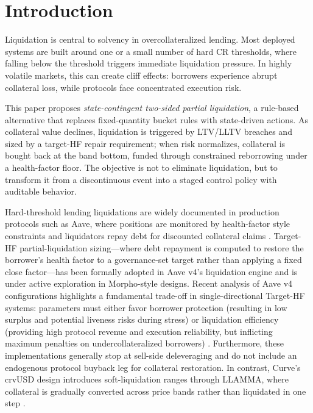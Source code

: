 \documentclass[12pt]{article}
\begin{document}
\begin{abstract}
deep-crash paths, the guarded leg never induces extra liquidation and incurs zero bad debt; its USD benefit is small and dormant on calm windows (it acts only over a full drawdown--rebound cycle) and large in crashes, tracing a restoration-vs-re-leverage trade-off set explicitly by the floor. We report effect sizes with attention to window dependence---the rolling windows overlap, so their paired $p$-values are descriptive rather than independent evidence---and provide a fully reproducible protocol that regenerates every result.
\end{abstract}

\section{Introduction}
Liquidation is central to solvency in overcollateralized lending. Most deployed systems are built around one or a small number of hard CR thresholds, where falling below the threshold triggers immediate liquidation pressure. In highly volatile markets, this can create cliff effects: borrowers experience abrupt collateral loss, while protocols face concentrated execution risk.

This paper proposes \emph{state-contingent two-sided partial liquidation}, a rule-based alternative that replaces fixed-quantity bucket rules with state-driven actions. As collateral value declines, liquidation is triggered by LTV/LLTV breaches and sized by a target-HF repair requirement; when risk normalizes, collateral is bought back at the band bottom, funded through constrained reborrowing under a health-factor floor. The objective is not to eliminate liquidation, but to transform it from a discontinuous event into a staged control policy with auditable behavior.

Hard-threshold lending liquidations are widely documented in production protocols such as Aave, where positions are monitored by health-factor style constraints and liquidators repay debt for discounted collateral claims \cite{aave-liquidations}. Target-HF partial-liquidation sizing---where debt repayment is computed to restore the borrower's health factor to a governance-set target rather than applying a fixed close factor---has been formally adopted in Aave v4's liquidation engine \cite{aave-v4-liquidations} and is under active exploration in Morpho-style designs. Recent analysis of Aave v4 configurations highlights a fundamental trade-off in single-directional Target-HF systems: parameters must either favor borrower protection (resulting in low surplus and potential liveness risks during stress) or liquidation efficiency (providing high protocol revenue and execution reliability, but inflicting maximum penalties on undercollateralized borrowers) \cite{aave-v4-spoke-revenue}. Furthermore, these implementations generally stop at sell-side deleveraging and do not include an endogenous protocol buyback leg for collateral restoration. In contrast, Curve's crvUSD design introduces soft-liquidation ranges through LLAMMA, where collateral is gradually converted across price bands rather than liquidated in one step \cite{curve-crvusd,curve-llamma}.
\end{document}
